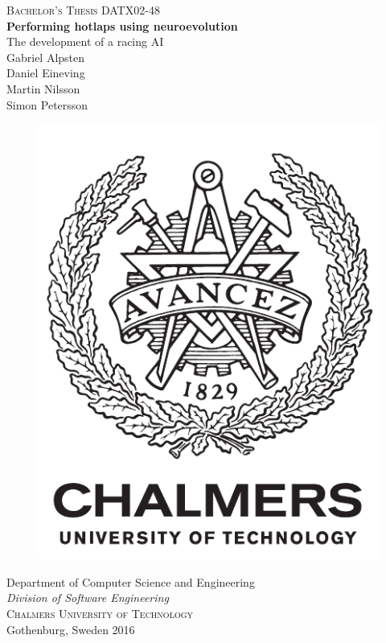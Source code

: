 \newpage
\thispagestyle{empty}
\begin{center}
	\textsc{\large Bachelor's Thesis DATX02-48 }\\[4cm]		%
	\textbf{\Large Performing hotlaps using neuroevolution} \\[1cm]
	{\large The development of a racing AI}\\[1cm]
	{\large Gabriel Alpsten}\\
	{\large Daniel Eineving}\\
	{\large Martin Nilsson}\\
	{\large Simon Petersson}
	
	\vfill	
	\begin{figure}[H]
	\centering
	\includegraphics[width=0.2\pdfpagewidth]{report/images/auxiliary/logo_eng.pdf} \\	
	\end{figure}	\vspace{5mm}	

	Department of Computer Science and Engineering \\
	\emph{Division of Software Engineering}\\
	\textsc{Chalmers University of Technology} \\
	Gothenburg, Sweden 2016 \\
\end{center}


